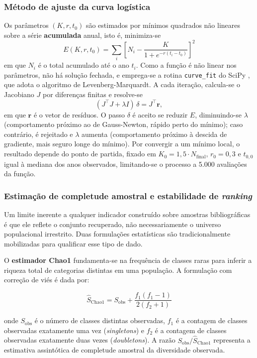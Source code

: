 \documentclass[12pt, a4paper]{article}
\begin{document}
    \subsubsection{Método de ajuste da curva logística}

  Os parâmetros $(K, r, t_0)$ são estimados por mínimos quadrados não lineares sobre a série \textbf{acumulada} anual, isto é, minimiza-se
$$E(K, r, t_0) = \sum_i \left[ N_i - \frac{K}{1 + e^{-r(t_i - t_0)}} \right]^2$$
em que $N_i$ é o total acumulado até o ano $t_i$. Como a função é não linear nos parâmetros, não há solução fechada, e emprega-se a rotina \texttt{curve\_fit} do SciPy \cite{virtanen2020}, que adota o algoritmo de Levenberg-Marquardt. A cada iteração, calcula-se o Jacobiano $J$ por diferenças finitas e resolve-se
$$(J^\top J + \lambda I)\,\delta = J^\top \mathbf{r},$$
em que $\mathbf{r}$ é o vetor de resíduos. O passo $\delta$ é aceito se reduzir $E$, diminuindo-se $\lambda$ (comportamento próximo ao de Gauss-Newton, rápido perto do mínimo); caso contrário, é rejeitado e $\lambda$ aumenta (comportamento próximo à descida de gradiente, mais seguro longe do mínimo). Por convergir a um mínimo local, o resultado depende do ponto de partida, fixado em $K_0 = 1{,}5 \cdot N_{\text{final}}$, $r_0 = 0{,}3$ e $t_{0,0}$ igual à mediana dos anos observados, limitando-se o processo a 5.000 avaliações da função.

    \subsubsection{Estimação de completude amostral e estabilidade de \textit{ranking}}

  Um limite inerente a qualquer indicador construído sobre amostras bibliográficas é que ele reflete
o conjunto recuperado, não necessariamente o universo populacional irrestrito. Duas formulações estatísticas
são tradicionalmente mobilizadas para qualificar esse tipo de dado.

  O \textbf{estimador Chao1} \cite{chao1984} fundamenta-se na frequência de classes raras para inferir a riqueza total de categorias distintas em uma população. A formulação com correção de viés é dada por:

$$
\hat{S}_{\text{Chao1}} = S_{\text{obs}} + \frac{f_1 (f_1 - 1)}{2 (f_2 + 1)}
$$

  onde $S_{\text{obs}}$ é o número de classes distintas observadas, $f_1$ é a contagem de classes observadas exatamente uma vez (\textit{singletons}) e $f_2$ é a contagem de classes observadas exatamente duas vezes (\textit{doubletons}). A razão $S_{\text{obs}} / \hat{S}_{\text{Chao1}}$ representa a estimativa assintótica de completude amostral da diversidade observada.
\end{document}
